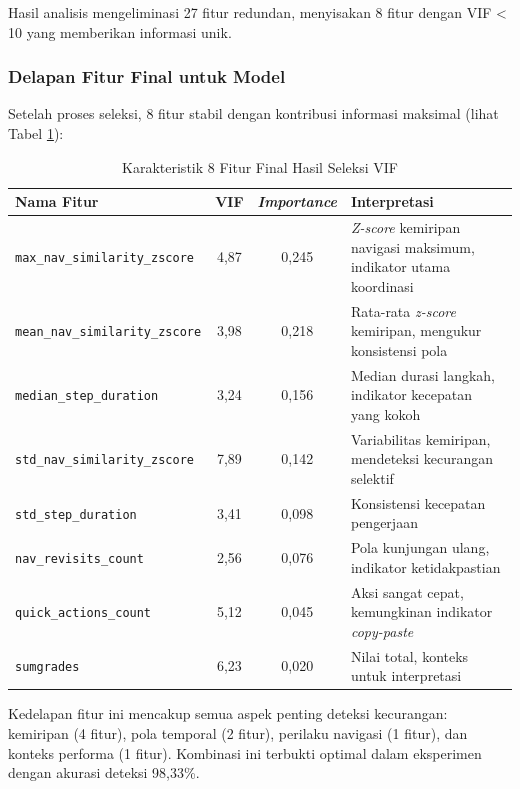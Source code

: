 Hasil analisis mengeliminasi 27 fitur redundan, menyisakan 8 fitur dengan VIF < 10 yang memberikan informasi unik.

\subsubsection{Delapan Fitur Final untuk Model}
\label{sec:fiturFinal}

Setelah proses seleksi, 8 fitur stabil dengan kontribusi informasi maksimal (lihat Tabel \ref{tabel:fiturFinalKarakteristik}):

\begin{table}[htbp]
\centering
\caption{Karakteristik 8 Fitur Final Hasil Seleksi VIF}
\label{tabel:fiturFinalKarakteristik}
\begin{tabular}{|p{7cm}|c|c|p{5cm}|}
\hline
\textbf{Nama Fitur} & \textbf{VIF} & \textbf{\textit{Importance}} & \textbf{Interpretasi} \\
\hline
\texttt{max\_nav\_similarity\_zscore} & 4,87 & 0,245 & \textit{Z-score} kemiripan navigasi maksimum, indikator utama koordinasi \\
\hline
\texttt{mean\_nav\_similarity\_zscore} & 3,98 & 0,218 & Rata-rata \textit{z-score} kemiripan, mengukur konsistensi pola \\
\hline
\texttt{median\_step\_duration} & 3,24 & 0,156 & Median durasi langkah, indikator kecepatan yang kokoh \\
\hline
\texttt{std\_nav\_similarity\_zscore} & 7,89 & 0,142 & Variabilitas kemiripan, mendeteksi kecurangan selektif \\
\hline
\texttt{std\_step\_duration} & 3,41 & 0,098 & Konsistensi kecepatan pengerjaan \\
\hline
\texttt{nav\_revisits\_count} & 2,56 & 0,076 & Pola kunjungan ulang, indikator ketidakpastian \\
\hline
\texttt{quick\_actions\_count} & 5,12 & 0,045 & Aksi sangat cepat, kemungkinan indikator \textit{copy-paste} \\
\hline
\texttt{sumgrades} & 6,23 & 0,020 & Nilai total, konteks untuk interpretasi \\
\hline
\end{tabular}
\end{table}

Kedelapan fitur ini mencakup semua aspek penting deteksi kecurangan: kemiripan (4 fitur), pola temporal (2 fitur), perilaku navigasi (1 fitur), dan konteks performa (1 fitur). Kombinasi ini terbukti optimal dalam eksperimen dengan akurasi deteksi 98,33\%.